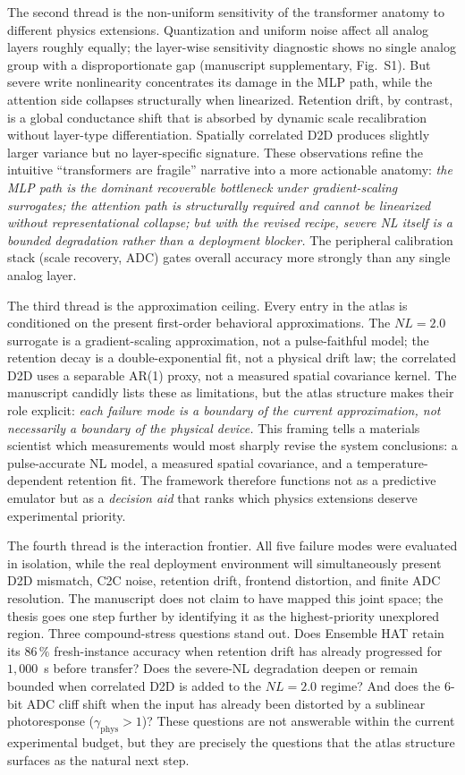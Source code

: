 The second thread is the non-uniform sensitivity of the transformer anatomy to different physics extensions.  Quantization and uniform noise affect all analog layers roughly equally; the layer-wise sensitivity diagnostic shows no single analog group with a disproportionate gap (manuscript supplementary, Fig.~S1).  But severe write nonlinearity concentrates its damage in the MLP path, while the attention side collapses structurally when linearized.  Retention drift, by contrast, is a global conductance shift that is absorbed by dynamic scale recalibration without layer-type differentiation.  Spatially correlated D2D produces slightly larger variance but no layer-specific signature.  These observations refine the intuitive ``transformers are fragile'' narrative into a more actionable anatomy: \emph{the MLP path is the dominant recoverable bottleneck under gradient-scaling surrogates; the attention path is structurally required and cannot be linearized without representational collapse; but with the revised recipe, severe NL itself is a bounded degradation rather than a deployment blocker.}  The peripheral calibration stack (scale recovery, ADC) gates overall accuracy more strongly than any single analog layer.

The third thread is the approximation ceiling.  Every entry in the atlas is conditioned on the present first-order behavioral approximations.  The $NL=2.0$ surrogate is a gradient-scaling approximation, not a pulse-faithful model; the retention decay is a double-exponential fit, not a physical drift law; the correlated D2D uses a separable AR(1) proxy, not a measured spatial covariance kernel.  The manuscript candidly lists these as limitations, but the atlas structure makes their role explicit: \emph{each failure mode is a boundary of the current approximation, not necessarily a boundary of the physical device.}  This framing tells a materials scientist which measurements would most sharply revise the system conclusions: a pulse-accurate NL model, a measured spatial covariance, and a temperature-dependent retention fit.  The framework therefore functions not as a predictive emulator but as a \emph{decision aid} that ranks which physics extensions deserve experimental priority.

The fourth thread is the interaction frontier.  All five failure modes were evaluated in isolation, while the real deployment environment will simultaneously present D2D mismatch, C2C noise, retention drift, frontend distortion, and finite ADC resolution.  The manuscript does not claim to have mapped this joint space; the thesis goes one step further by identifying it as the highest-priority unexplored region.  Three compound-stress questions stand out.  Does Ensemble HAT retain its $86\,\%$ fresh-instance accuracy when retention drift has already progressed for $1{,}000$~s before transfer?  Does the severe-NL degradation deepen or remain bounded when correlated D2D is added to the $NL=2.0$ regime?  And does the $6$-bit ADC cliff shift when the input has already been distorted by a sublinear photoresponse ($\gamma_{\mathrm{phys}} > 1$)?  These questions are not answerable within the current experimental budget, but they are precisely the questions that the atlas structure surfaces as the natural next step.

